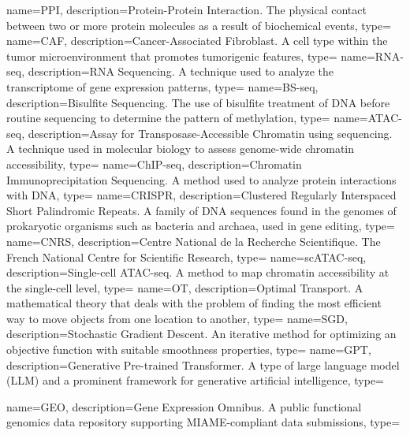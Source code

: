 {
    name={PPI},
    description={Protein-Protein Interaction. The physical contact between two or more protein molecules as a result of biochemical events},
    type=\acronymtype
}
{
    name={CAF},
    description={Cancer-Associated Fibroblast. A cell type within the tumor microenvironment that promotes tumorigenic features},
    type=\acronymtype
}
{
    name={RNA-seq},
    description={RNA Sequencing. A technique used to analyze the transcriptome of gene expression patterns},
    type=\acronymtype
}
{
    name={BS-seq},
    description={Bisulfite Sequencing. The use of bisulfite treatment of DNA before routine sequencing to determine the pattern of methylation},
    type=\acronymtype
}
{
    name={ATAC-seq},
    description={Assay for Transposase-Accessible Chromatin using sequencing. A technique used in molecular biology to assess genome-wide chromatin accessibility},
    type=\acronymtype
}
{
    name={ChIP-seq},
    description={Chromatin Immunoprecipitation Sequencing. A method used to analyze protein interactions with DNA},
    type=\acronymtype
}
{
    name={CRISPR},
    description={Clustered Regularly Interspaced Short Palindromic Repeats. A family of DNA sequences found in the genomes of prokaryotic organisms such as bacteria and archaea, used in gene editing},
    type=\acronymtype
}
{
    name={CNRS},
    description={Centre National de la Recherche Scientifique. The French National Centre for Scientific Research},
    type=\acronymtype
}
{
    name={scATAC-seq},
    description={Single-cell ATAC-seq. A method to map chromatin accessibility at the single-cell level},
    type=\acronymtype
}
{
    name={OT},
    description={Optimal Transport. A mathematical theory that deals with the problem of finding the most efficient way to move objects from one location to another},
    type=\acronymtype
}
{
    name={SGD},
    description={Stochastic Gradient Descent. An iterative method for optimizing an objective function with suitable smoothness properties},
    type=\acronymtype
}
{
    name={GPT},
    description={Generative Pre-trained Transformer. A type of large language model (LLM) and a prominent framework for generative artificial intelligence},
    type=\acronymtype
}

{
    name={GEO},
    description={Gene Expression Omnibus. A public functional genomics data repository supporting MIAME-compliant data submissions},
    type=\acronymtype
}

